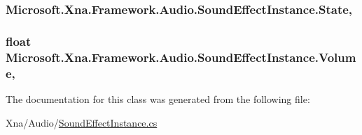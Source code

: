 \subsubsection[{State}]{ Microsoft.\+Xna.\+Framework.\+Audio.\+Sound\+Effect\+Instance.\+State\hspace{0.3cm}{\ttfamily [get]}, {\ttfamily [set]}}\label{class_microsoft_1_1_xna_1_1_framework_1_1_audio_1_1_sound_effect_instance_aa291a13599ec14eca2f82505d4507a00}
\hypertarget{class_microsoft_1_1_xna_1_1_framework_1_1_audio_1_1_sound_effect_instance_aed5b820c1a911fa4a2fd77d3e25632cf}{}
\subsubsection[{Volume}]{\setlength{\rightskip}{0pt plus 5cm}float Microsoft.\+Xna.\+Framework.\+Audio.\+Sound\+Effect\+Instance.\+Volume\hspace{0.3cm}{\ttfamily [get]}, {\ttfamily [set]}}\label{class_microsoft_1_1_xna_1_1_framework_1_1_audio_1_1_sound_effect_instance_aed5b820c1a911fa4a2fd77d3e25632cf}


The documentation for this class was generated from the following file\+:\begin{DoxyCompactItemize}
\item 
Xna/\+Audio/\hyperlink{_sound_effect_instance_8cs}{Sound\+Effect\+Instance.\+cs}\end{DoxyCompactItemize}
